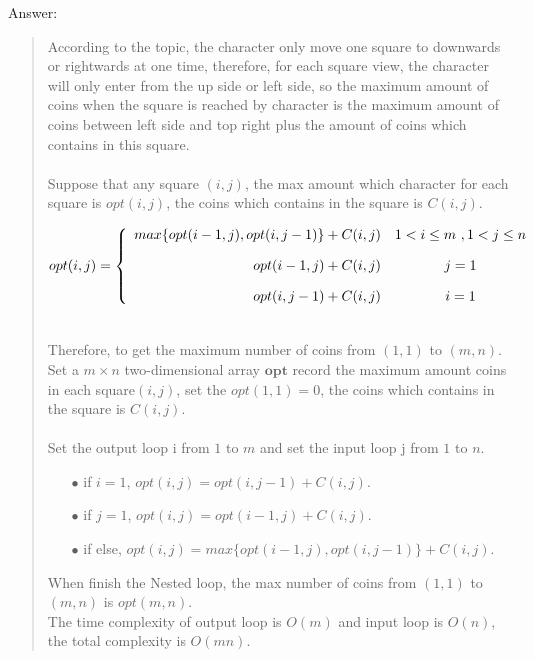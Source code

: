 \documentclass{article}
\begin{document}
\begin{Question}
\begin{Subquestion}
\begin{answer}
Answer:
\begin{quote}
    According to the topic, the character only move one square to downwards or rightwards at one time, therefore, for each square view, the character will only enter from the up side or left side, so the maximum amount of coins when the square is reached by character is the maximum amount of coins between left side and top right plus the amount of coins which contains in this square.\\\\
    Suppose that any square $(i, j)$, the max amount which character for each square is $opt(i, j)$, the coins which contains in the square is $C(i, j)$.
    \begin{center}
    $opt(i, j) = \left\{
        \begin{array}{rcl}
            max\{opt(i-1, j), opt(i, j-1)\} + C(i, j) & 1 < i \leq m\ , 1 < j \leq n \vspace{1em}\\
            opt(i-1, j) + C(i, j) & j = 1\vspace{1em}\\
            opt(i, j-1) + C(i, j) & i = 1\\
        \end{array}
    \right.$
    \end{center}
    \\Therefore, to get the maximum number of coins from $(1,1)$ to $(m, n)$. Set a  $m \times n$ two-dimensional array $\textbf{opt}$ record the maximum amount coins in each square$(i, j)$, set the $opt(1, 1) = 0$, the coins which contains in the square is $C(i, j)$.\\\\
    Set the output loop i from $1$ to $m$ and set the input loop j from $1$ to $n$.
    \begin{itemize}
        \item [$\bullet$] if $i = 1$, $opt(i, j) = opt(i, j-1) + C(i, j)$.
        \item [$\bullet$] if $j = 1$, $opt(i, j) = opt(i-1, j) + C(i, j)$.
        \item [$\bullet$] if else, $opt(i, j) = max\{opt(i-1, j), opt(i, j-1)\} + C(i, j)$.\vspace{1em}
    \end{itemize}
    When finish the Nested loop, the max number of coins from $(1, 1)$ to $(m, n)$ is $opt(m, n)$.\vspace{1em}\\
    The time complexity of output loop is $O(m)$ and input loop is $O(n)$, the total complexity is $O(mn)$.\\
\end{quote}
\end{answer}
\end{Subquestion}


\end{Question}
\end{document}

